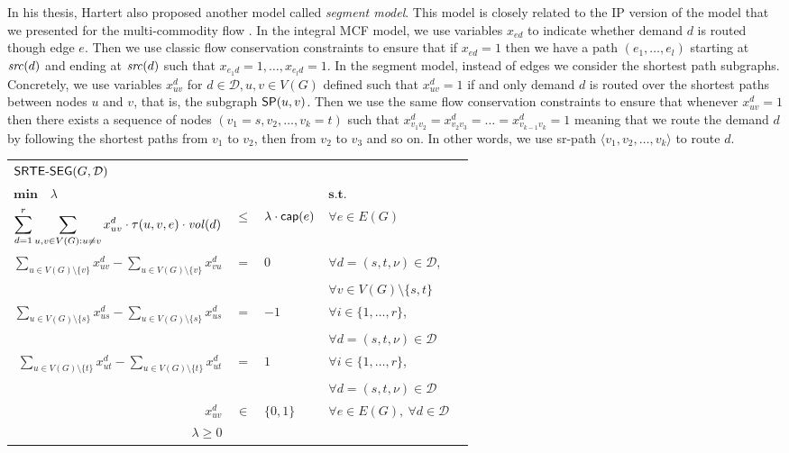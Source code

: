 In his thesis, Hartert also proposed another model called \emph{segment model}. This model is closely related to the IP version of the model that we presented for the
multi-commodity flow \mcflp. In the integral MCF model, we use variables $x_{ed}$ to indicate whether demand $d$ is routed though edge $e$. Then
we use classic flow conservation constraints to ensure that if $x_{ed} = 1$ then we have a path $(e_1, \ldots, e_l)$ starting at
$\src(d)$ and ending at $\src(d)$ such that $x_{e_1 d} = 1, \ldots, x_{e_l d} = 1$. In the segment model, instead of edges we consider the shortest
path subgraphs. Concretely, we use variables $x^d_{u v}$ for $d \in \mathcal{D}, u, v \in V(G)$
defined such that $x^d_{u v} = 1$ if and only demand $d$ is routed over the shortest paths between nodes $u$ and $v$, that is, the subgraph $\sp(u, v)$. 
Then we use the same flow conservation constraints to ensure that whenever $x^d_{uv} = 1$ then there exists a sequence of nodes
$(v_1 = s, v_2, \ldots, v_k = t)$ such that $x^d_{v_1 v_2} = x^d_{v_2 v_3} = \ldots = x^d_{v_{k - 1} v_k} = 1$ meaning that we route the demand
$d$ by following the shortest paths from $v_1$ to $v_2$, then from $v_2$ to $v_3$ and so on. In other words, we use sr-path 
$\langle v_1, v_2, \ldots, v_k \rangle$ to route $d$.

\begin{center}
\begin{tabular}{rcllr}
\multicolumn{5}{l}{$\srteseg(G, \mathcal{D})$} \\[0.5cm] 
\multicolumn{3}{l}{$\mathbf{min} \quad \lambda$} & $\textbf{s.t.}$ & \\[0.5cm]
$\displaystyle \sum_{d = 1}^r \sum_{u, v \in V(G) : u \neq v} x^d_{uv} \cdot \r(u, v, e) \cdot \vol(d)$ & $\leq$ & $\lambda \cdot \bnd(e)$ & $\forall e \in E(G)$ & \\[0.5cm]
$\displaystyle \sum_{u \in V(G) \setminus \{ v \}} x^d_{uv} - \sum_{u \in V(G) \setminus \{ v \}} x^d_{vu}$ & $=$    &  $0$ & $\forall d = (s, t, \nu) \in \mathcal{D}$, & \\[-0.2cm]
& & & $\forall v \in V(G) \setminus \{ s, t \}$ & \\[0.5cm]
$\displaystyle \sum_{u \in V(G) \setminus \{ s \}} x^d_{us} - \sum_{u \in V(G) \setminus \{ s \}} x^d_{us}$ & $=$    & $-1$ & $\forall i \in \{ 1, \ldots, r \}$, \\[-0.2cm]
& & & $\forall d = (s, t, \nu) \in \mathcal{D}$ \\[0.5cm]
$\displaystyle \sum_{u \in V(G) \setminus \{ t \}} x^d_{ut} - \sum_{u \in V(G) \setminus \{ t \}} x^d_{ut}$ & $=$    &  $1$ & $\forall i \in \{ 1, \ldots, r \}$, \\[-0.2cm]
& & & $\forall d = (s, t, \nu) \in \mathcal{D}$ \\[0.5cm] 
$x^d_{uv}$  &    $\in$    &  $\{0, 1\}$  & $\forall e \in E(G), \ \forall d \in \mathcal{D}$ & \\[0.5cm]
$\lambda \geq 0$ & & & &    
\end{tabular}
\end{center}


